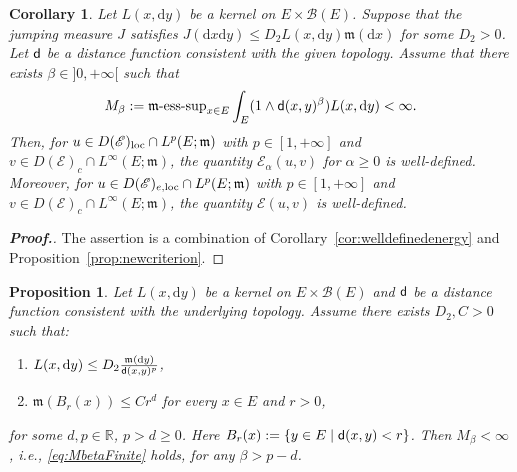 \documentclass[12pt,a4paper]{article}
\newtheorem{prop}[thm]{Proposition}
\newtheorem{cor}[thm]{Corollary}
\newcommand{\R}{\mathbb{R}}
\renewcommand{\d}{\mathrm{d}}
\newcommand{\m}{\mathfrak{m} }
\newcommand{\loc}{{\rm loc}}
\newcommand{\1}{{\bf 1}}
\begin{document}
\begin{cor}\label{cor:newcriterion}
Let $L(x,{\d} y)$ be a kernel on $E\times\mathscr{B}(E)$.
Suppose that the jumping measure $J$ satisfies $J({\d} x{\d} y)\leq D_2L(x,{\d} y){\m}({\d} x)$ for some $D_2>0$. 
Let ${\sf d}$ be a distance function consistent with the given topology. Assume 
that there exists $\beta\in]0,+\infty[$ such that 
\begin{align}
M_{\beta}:={\m}\text{\rm-ess-sup}_{x\in E}\int_E(1\land {\sf d}(x,y)^{\beta})L(x,{\d} y)<\infty.\label{eq:MbetaFinite}
\end{align} 
Then, for $u\in D(\mathscr{E})_{\loc}\cap L^p(E;{\m})$ with $p\in[1,+\infty]$ and $v\in D(\mathscr{E})_c\cap L^{\infty}(E;{\m})$, 
the quantity $\mathscr{E}_{\alpha}(u,v)$ for $\alpha\geq0$ is well-defined. Moreover, 
for $u\in D(\mathscr{E})_{e,\loc}\cap L^p(E;{\m})$ with $p\in[1,+\infty]$ and $v\in D(\mathscr{E})_c\cap L^{\infty}(E;{\m})$, 
the quantity $\mathscr{E}(u,v)$ is well-defined. 
\end{cor} 
\begin{proof}[{\bf Proof.}]
The assertion is a combination of Corollary~\ref{cor:welldefinedenergy}
and Proposition~\ref{prop:newcriterion}.
\end{proof}
\begin{prop}
\label{cor:Criteion}
Let $L(x,{\d} y)$ be a kernel on $E\times\mathscr{B}(E)$ and ${\sf d}$ be a distance function consistent with the underlying topology.
Assume there exists $D_2, C > 0$ such that:
\begin{enumerate}
    \item $L(x,{\d} y) 
    \leq D_2 \frac{{\m}({\d} y)}{{\sf d}(x,y)^p}$,
    \item ${\m}(B_r(x))\leq Cr^d$ for every $x \in E$ and $r > 0$,
\end{enumerate}
for some $d, p \in \R$, $p >d\geq0$. Here $B_r(x):=\{y\in E\mid {\sf d}(x,y)<r\}$. Then $M_\beta < \infty$, i.e.,
\eqref{eq:MbetaFinite} holds, for any $\beta > p - d$.
\end{prop} 
\end{document}
